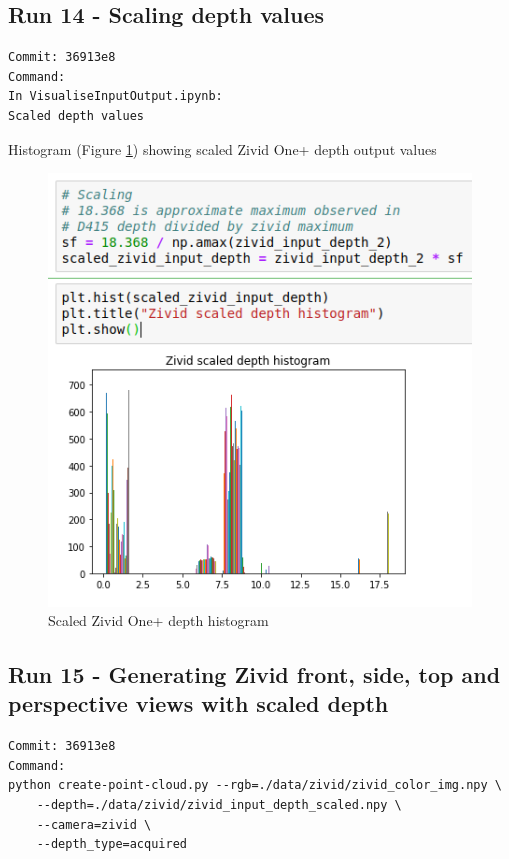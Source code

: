 \subsection{Run 14 - Scaling depth values}
\label{app_res:14}

\label{app_res:10}
\begin{verbatim}
Commit: 36913e8
Command: 
In VisualiseInputOutput.ipynb:
Scaled depth values 
\end{verbatim}

Histogram (Figure \ref{fig:ScaledZividHistogram})  showing scaled Zivid One+ depth output values

\begin{figure}[h!]
\centering
\includegraphics[width=\textwidth]{Figures/ScaledZividHistogram.png}
\caption{Scaled Zivid One+ depth histogram}
\label{fig:ScaledZividHistogram}
\end{figure}

\subsection{Run 15 - Generating Zivid front, side, top and perspective views with scaled depth}
\label{app_res:12}
\begin{verbatim}
Commit: 36913e8
Command: 
python create-point-cloud.py --rgb=./data/zivid/zivid_color_img.npy \
    --depth=./data/zivid/zivid_input_depth_scaled.npy \
    --camera=zivid \
    --depth_type=acquired
\end{verbatim}

